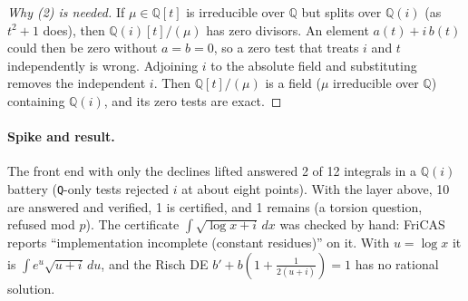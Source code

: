 \documentclass[11pt]{article}
\theoremstyle{definition}
\theoremstyle{remark}
\newcommand{\Q}{\mathbb{Q}}
\newcommand{\code}[1]{\texttt{#1}}
\begin{document}
\begin{proof}[Why (2) is needed]
If $\mu\in\Q[t]$ is irreducible over $\Q$ but splits over $\Q(i)$ (as
$t^2+1$ does), then $\Q(i)[t]/(\mu)$ has zero divisors. An element
$a(t)+i\,b(t)$ could then be zero without $a=b=0$, so a zero test that treats
$i$ and $t$ independently is wrong. Adjoining $i$ to the absolute field and
substituting removes the independent $i$. Then $\Q[t]/(\mu)$ is a field
($\mu$ irreducible over $\Q$) containing $\Q(i)$, and its zero tests are exact.
\end{proof}

\paragraph{Spike and result.} The front end with only the declines lifted
answered 2 of 12 integrals in a $\Q(i)$ battery (\code{Q}-only tests rejected
$i$ at about eight points). With the layer above, 10 are answered and verified,
1 is certified, and 1 remains (a torsion question, refused mod $p$). The
certificate $\int\sqrt{\log x+i}\,dx$ was checked by hand: FriCAS reports
``implementation incomplete (constant residues)'' on it. With $u=\log x$ it is
$\int e^u\sqrt{u+i}\,du$, and the Risch DE $b'+b(1+\tfrac1{2(u+i)})=1$ has no
rational solution.
\end{document}
